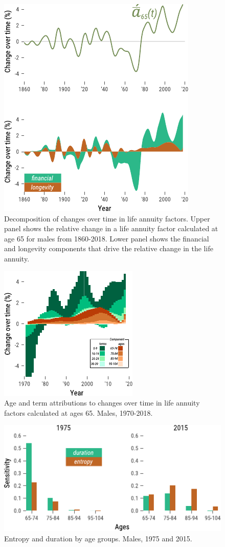 \documentclass[12pt]{article}
\begin{document}
\begin{figure}[!ht]
	\centering
	\includegraphics[width=0.5\linewidth]{Fig/DescSingle}
	\caption{{Decomposition of changes over time in life annuity factors. Upper panel shows the relative change in a life annuity factor calculated at age 65 for males from 1860-2018. Lower panel shows the financial and longevity components that drive the relative change in the life annuity. }}
	\label{fig:Fig4}
\end{figure}



\begin{figure}[!ht]
	\centering
	\includegraphics[width=0.4\linewidth]{Fig/DescAge}
	\caption{{Age and term attributions to changes over time in life annuity factors calculated at ages 65. Males, 1970-2018.}}
	\label{fig:Fig5}
\end{figure}


\begin{figure}[!ht]
	\centering
	\includegraphics[width=0.7\linewidth]{Fig/AttributionDH}
	\caption{{Entropy and duration by age groups. Males, 1975 and 2015.}}
	\label{fig:Fig6}
\end{figure}
\end{document}
